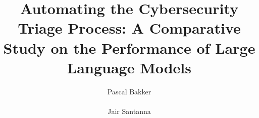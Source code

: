 \documentclass{../libs/sig-alternate}
\begin{document}
    \title{Automating the Cybersecurity Triage Process: A Comparative Study on the Performance of Large Language Models}


    \author{
        \alignauthor
        Pascal Bakker\\
        \\
        \alignauthor
        Jair Santanna\\
        \\
        \\
    }

    \maketitle

    
    
    
    
    

    \newcommand{\newblock}{}
    

\end{document}
